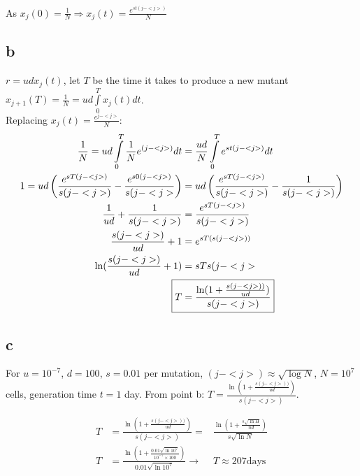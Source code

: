 As $x_j(0) = \frac{1}{N} \Rightarrow \boxed{x_j(t) = \frac{e^{st(j-<j>)}}{N}} $

\subsection{b}

$r = udx_j(t)$, let $T$ be the time it takes to produce a new mutant $x_{j+1}(T) = \frac{1}{N} = ud\int\limits_{0}^{T} x_j(t)dt$.\\
Replacing $x_j(t) = \frac{e^{j-<j>}}{N} : $
\begin{align*}
\frac{1}{N} = ud\int\limits_{0}^{T} \frac{1}{N}e^{(j-<j>)}dt &= \frac{ud}{N}\int\limits_{0}^{T} e^{st(j-<j>)}dt\\
1 = ud\left(\frac{e^{sT(j-<j>)}}{s(j-<j>)}-\frac{e^{s0(j-<j>)}}{s(j-<j>}\right) &= ud\left( \frac{e^{sT(j-<j>)}}{s(j-<j>)} - \frac{1}{s(j-<j>)}\right)\\
 \frac{1}{ud}+\frac{1}{s(j-<j>)} &= \frac{e^{sT(j-<j>)}}{s(j-<j>)}\\
 \frac{s(j-<j>)}{ud}+1 &= e^{sT(s(j-<j>))}\\
 \ln (\frac{s(j-<j>)}{ud}+1) &= sTs(j-<j>\\
 \Aboxed{T &= \frac{\ln(1+\frac{s(j-<j>))}{ud})}{s(j-<j>)}}
\end{align*}

\subsection{c}

For $u=10^{-7}$, $d=100$, $s=0.01$ per mutation, $(j-<j>) \approx \sqrt{\log N}$, $N=10^{7}$ cells, generation time $t=1$ day.
From point b: $\boxed{T = \frac{\ln(1+\frac{s(j-<j>))}{ud})}{s(j-<j>)}}$.

\begin{align*}
T &= \frac{\ln(1+\frac{s(j-<j>))}{ud})}{s(j-<j>)} =& \frac{\ln (1+\frac{s\sqrt{\ln H}}{nd})}{s\sqrt{\ln N}} \\
T &= \frac{\ln (1+\frac{0.01\sqrt{\ln 10^7}}{10^{-7}\times 100})}{0.01\sqrt{\ln 10^7}} \rightarrow & T \approx 207 \text{days}
\end{align*}






